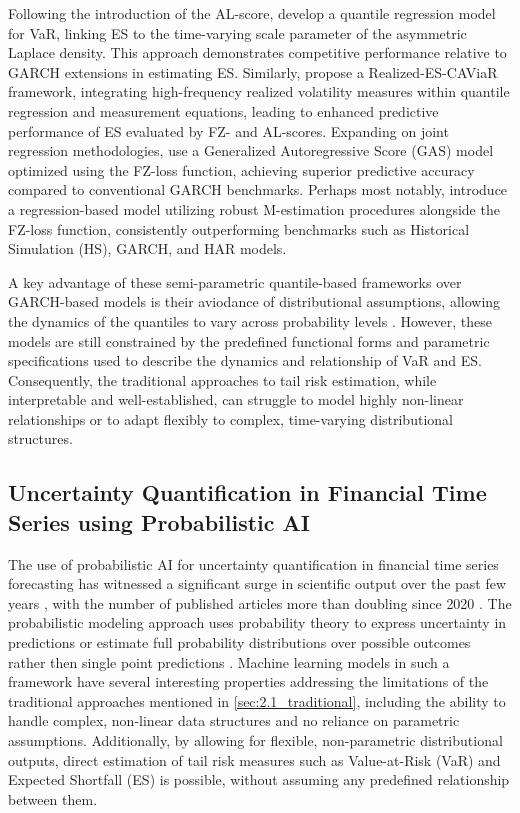Following the introduction of the AL-score, \textcite{Taylor2017} develop a quantile regression model for VaR, linking ES to the time-varying scale parameter of the asymmetric Laplace density. This approach demonstrates competitive performance relative to GARCH extensions in estimating ES. Similarly, \textcite{chao2018} propose a Realized-ES-CAViaR framework, integrating high-frequency realized volatility measures within quantile regression and measurement equations, leading to enhanced predictive performance of ES evaluated by FZ- and AL-scores. Expanding on joint regression methodologies, \textcite{Patton2019} use a Generalized Autoregressive Score (GAS) model optimized using the FZ-loss function, achieving superior predictive accuracy compared to conventional GARCH benchmarks. Perhaps most notably, \textcite{Dimitriadis_2019db} introduce a regression-based model utilizing robust M-estimation procedures alongside the FZ-loss function, consistently outperforming benchmarks such as Historical Simulation (HS), GARCH, and HAR models.

A key advantage of these semi-parametric quantile-based frameworks over GARCH-based models is their aviodance of distributional assumptions, allowing the dynamics of the quantiles to vary across probability levels \parencite{Taylor2017}. However, these models are still constrained by the predefined functional forms and parametric specifications used to describe the dynamics and relationship of VaR and ES. Consequently, the traditional approaches to tail risk estimation, while interpretable and well-established, can struggle to model highly non-linear relationships or to adapt flexibly to complex, time-varying distributional structures.  

\subsection{Uncertainty Quantification in Financial Time Series using Probabilistic AI}
\label{sec:2.2_probai}

The use of probabilistic AI for uncertainty quantification in financial time series forecasting has witnessed a significant surge in scientific output over the past few years \parencite{Blasco2024}, with the number of published articles more than doubling since 2020 \parencite{eggen2025probabilistic}. The probabilistic modeling approach uses probability theory to express uncertainty in predictions or estimate full probability distributions over possible outcomes rather then single point predictions \parencite{Ghahramani2015}. Machine learning models in such a framework have several interesting properties addressing the limitations of the traditional approaches mentioned in \ref{sec:2.1_traditional}, including the ability to handle complex, non-linear data structures and no reliance on parametric assumptions. Additionally, by allowing for flexible, non-parametric distributional outputs, direct estimation of tail risk measures such as Value-at-Risk (VaR) and Expected Shortfall (ES) is possible, without assuming any predefined relationship between them.

